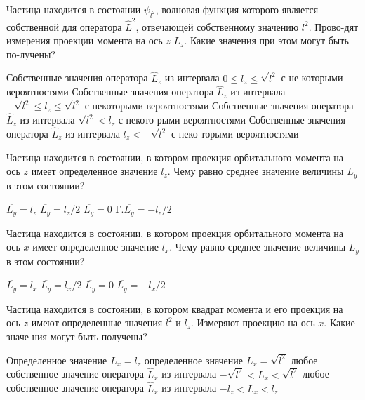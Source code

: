\documentclass[11pt,a4paper]{exam}
\begin{document}
\begin{questions}
\question Частица находится в состоянии ${\psi _{{l^2}}}$, волновая функция которого является собственной для оператора ${\hat L^2}$, отвечающей собственному значению ${l^2}$. Прово-дят измерения проекции момента на ось $z$ ${L_z}$. Какие значения при этом могут быть по-лучены?
\begin{choices}
\choice Собственные значения оператора ${\hat L_z}$ из интервала $0 \le {l_z} \le \sqrt {{l^2}} $ с не-которыми вероятностями
\choice Собственные значения оператора ${\hat L_z}$ из интервала $ - \sqrt {{l^2}}  \le {l_z} \le \sqrt {{l^2}} $ с некоторыми вероятностями
\choice Собственные значения оператора ${\hat L_z}$ из интервала $\sqrt {{l^2}}  < {l_z}$ с некото-рыми вероятностями
\choice Собственные значения оператора ${\hat L_z}$ из интервала ${l_z} <  - \sqrt {{l^2}} $ с неко-торыми вероятностями
\end{choices}

\question Частица находится в состоянии, в котором проекция орбитального момента на ось $z$ имеет определенное значение ${l_z}$. Чему равно среднее значение величины ${L_y}$ в этом состоянии?
\begin{choices}
\choice $\overline {{L_y}}  = {l_z}$     
\choice $\overline {{L_y}}  = {l_z}/2$      
\choice $\overline {{L_y}}  = 0$      Г.$\overline {{L_y}}  =  - {l_z}/2$
\end{choices}

\question Частица находится в состоянии, в котором проекция орбитального момента на ось $x$ имеет определенное значение ${l_x}$. Чему равно среднее значение величины ${L_y}$ в этом состоянии?
\begin{choices}
\choice $\overline {{L_y}}  = {l_x}$     
\choice $\overline {{L_y}}  = {l_x}/2$      
\choice $\overline {{L_y}}  = 0$      
\choice $\overline {{L_y}}  =  - {l_x}/2$
\end{choices}

\question Частица находится в состоянии, в котором квадрат момента и его проекция на ось $z$ имеют определенные значения ${l^2}$ и ${l_z}$. Измеряют проекцию на ось $x$. Какие значе-ния могут быть получены?
\begin{choices}
\choice Определенное значение ${L_x} = {l_z}$
\choice определенное значение ${L_x} = \sqrt {{l^2}} $
\choice любое собственное значение оператора ${\hat L_x}$ из интервала $ - \sqrt {{l^2}}  < {L_x} < \sqrt {{l^2}} $
\choice любое собственное значение оператора ${\hat L_x}$ из интервала $ - {l_z} < {L_x} < {l_z}$
\end{choices}


\end{questions}
\end{document}
